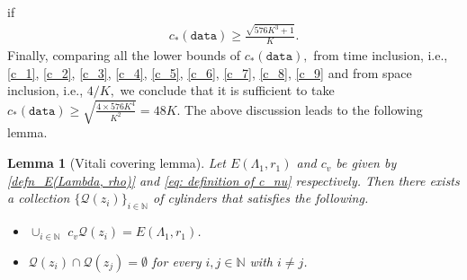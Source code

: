 \documentclass[11pt,oneside, english,reqno,twoside a4paper]{amsart}
\newtheorem{lemma}{Lemma}[section]
\theoremstyle{definition}
\numberwithin{theorem}{section}
\numberwithin{equation}{section}
\newcommand{\La}{\Lambda}
\begin{document}
if
\begin{align}\label{c_9}
    c_*(\texttt{data})\geq \frac{\sqrt{576K^3+1}}{K}.
\end{align}
Finally, comparing all the lower bounds of  $c_*(\texttt{data}),$ from time inclusion, i.e., \eqref{c_1}, \eqref{c_2}, \eqref{c_3}, \eqref{c_4}, \eqref{c_5}, \eqref{c_6}, \eqref{c_7}, \eqref{c_8}, \eqref{c_9} and from space inclusion, i.e., $4/K,$ we conclude that it is sufficient to take $c_*(\texttt{data})\geq \sqrt{\frac{4\times 576K^4}{K^2}}=48K.$ The above discussion leads to the following lemma.
\begin{lemma}[Vitali covering lemma]\label{vitali lemma}
 Let $E(\Lambda_1, r_1)$  and $c_v$ be given by \eqref{defn_E(Lambda, rho)} and \eqref{eq: definition of c_nu} respectively. Then there exists a collection $\{\mathcal{Q}({z_i})\}_{i\in \mathbb{N}}$ of cylinders that satisfies the following.
\begin{itemize}
\item [(i)] $\cup_{i\in\mathbb{N}}\,\,c_v \mathcal{Q}({z_i})=E(\La_1, r_1)$.
\item[(ii)] $\mathcal{Q}({z_i})\cap \mathcal{Q}({z_j})= \emptyset$ for every $i,j\in \mathbb{N}$ with $i\ne j$.
\end{itemize}   
\end{lemma}
\end{document}
